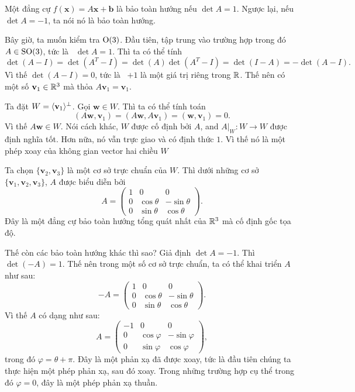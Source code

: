 \begin{defi}
  Một đẳng cự $f(\mathbf{x}) = A\mathbf{x} + \mathbf{b}$ là bảo toàn hướng nếu $\det A = 1$. Ngược lại, nếu $\det A = -1$, ta nói nó là bảo toàn hướng.
\end{defi}

\begin{eg}
  Bây giờ, ta muốn kiểm tra $\mathrm{O}(3)$. Đầu tiên, tập trung vào trường hợp trong đó $A \in \mathrm{SO}(3)$, tức là \ $\det A = 1$. Thì ta có thể tính
  \[
    \det(A - I) = \det(A^T - I) = \det(A)\det(A^T - I) = \det(I - A) = -\det(A - I).
  \]
  Vì thế $\det (A - I) = 0$, tức là \ $+1$ là một giá trị riêng trong $\mathbb{R}$. Thế nên có một số $\mathbf{v}_1 \in \mathbb{R}^3$ mà thỏa $A\mathbf{v}_1 = \mathbf{v}_1$.

  Ta đặt $W = \langle \mathbf{v}_1\rangle^{\perp}$. Gọi $\mathbf{w} \in W$. Thì ta có thể tính toán
  \[
    (A\mathbf{w}, \mathbf{v}_1) = (A\mathbf{w}, A\mathbf{v}_1) = (\mathbf{w}, \mathbf{v}_1) = 0.
  \]
  Vì thế $A\mathbf{w} \in W$. Nói cách khác, $W$ được cố định bởi $A$, and $A|_{W}: W \to W$ được định nghĩa tốt. Hơn nữa, nó vẫn trực giao và có định thức $1$. Vì thế nó là một phép xoay của không gian vector hai chiều $W$

  Ta chọn $\{\mathbf{v}_2, \mathbf{v}_3\}$ là một cơ sở trực chuẩn của $W$. Thì dưới những cơ sở $\{\mathbf{v}_1, \mathbf{v}_2, \mathbf{v}_3\}$, $A$  được biểu diễn bởi
  \[
    A =
    \begin{pmatrix}
      1 & 0 & 0\\
      0 & \cos \theta & - \sin \theta\\
      0 & \sin \theta & \cos \theta
    \end{pmatrix}.
  \]
  Đây là một đẳng cự bảo toàn hướng tổng quát nhất của $\mathbb{R}^3$ mà cố định gốc tọa độ.

  Thế còn các bảo toàn hướng khác thì sao?
  Giả định $\det A = -1$. Thì $\det(-A) = 1$. Thế nên trong một số cơ sở trực chuẩn, ta có thể khai triển $A$ như sau:
  \[
    -A =
    \begin{pmatrix}
      1 & 0 & 0\\
      0 & \cos \theta & - \sin \theta\\
      0 & \sin \theta & \cos \theta
    \end{pmatrix}.
  \]
  Vì thế $A$ có dạng như sau:
  \[
    A =
    \begin{pmatrix}
      -1 & 0 & 0\\
      0 & \cos \varphi & -\sin \varphi\\
      0 & \sin \varphi & \cos \varphi
    \end{pmatrix},
  \]
  trong đó $\varphi = \theta + \pi$. Đây là một phản xạ đã được xoay, tức là đầu tiên chúng ta thực hiện một phép phản xạ, sau đó xoay. Trong những trường hợp cụ thể trong đó $\varphi = 0$, đây là một phép phản xạ thuần.
\end{eg}

